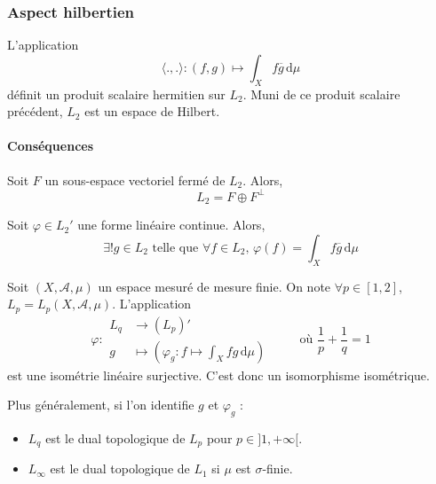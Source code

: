 	\subsubsection{Aspect hilbertien}


	\begin{definition}
		L'application
		\[ \langle ., . \rangle : (f,g) \mapsto \int_X f \overline{g} \, \mathrm{d}\mu \]
		définit un produit scalaire hermitien sur $L_2$. Muni de ce produit scalaire précédent, $L_2$ est un espace de Hilbert.
	\end{definition}

	\paragraph{Conséquences}

	\begin{theorem}
		Soit $F$ un sous-espace vectoriel fermé de $L_2$. Alors,
		\[ L_2 = F \oplus F^\perp \]
	\end{theorem}

	\begin{corollary}
		Soit $\varphi \in L_2'$ une forme linéaire continue. Alors,
		\[ \exists! g \in L_2 \text{ telle que } \forall f \in L_2, \, \varphi(f) = \int_X f \overline{g} \, \mathrm{d}\mu \]
	\end{corollary}


	\begin{application}[Dual de $L_p$]
		Soit $(X, \mathcal{A}, \mu)$ un espace mesuré de mesure finie. On note $\forall p \in [1, 2]$, $L_p = L_p(X, \mathcal{A}, \mu)$. L'application
		\[
		\varphi :
		\begin{array}{ll}
			L_q &\rightarrow (L_p)' \\
			g &\mapsto \left( \varphi_g : f \mapsto \int_X f g \, \mathrm{d}\mu \right)
		\end{array}
		\qquad \text{ où } \frac{1}{p} + \frac{1}{q} = 1
		\]
		est une isométrie linéaire surjective. C'est donc un isomorphisme isométrique.
	\end{application}


	\begin{remark}
		Plus généralement, si l'on identifie $g$ et $\varphi_g$ :
		\begin{itemize}
			\item $L_q$ est le dual topologique de $L_p$ pour $p \in ]1, +\infty[$.
			\item $L_\infty$ est le dual topologique de $L_1$ si $\mu$ est $\sigma$-finie.
		\end{itemize}
	\end{remark}


